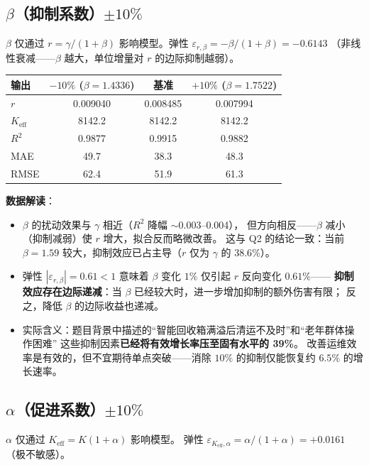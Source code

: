 \documentclass[12pt,a4paper]{article}
\begin{document}
\subsection{$\beta$（抑制系数）$\pm 10\%$}

$\beta$ 仅通过 $r = \gamma/(1+\beta)$ 影响模型。弹性 $\varepsilon_{r,\beta} = -\beta/(1+\beta) = -0.6143$
（非线性衰减——$\beta$ 越大，单位增量对 $r$ 的边际抑制越弱）。

\begin{center}
\begin{tabular}{lccc}
\toprule
输出 & $-10\%$ ($\beta = 1.4336$) & 基准 & $+10\%$ ($\beta = 1.7522$) \\
\midrule
$r$      & 0.009040 & 0.008485 & 0.007994 \\
$K_{\text{eff}}$ & 8142.2 & 8142.2 & 8142.2 \\
$R^2$    & 0.9877 & 0.9915 & 0.9882 \\
MAE      & 49.7 & 38.3 & 48.3 \\
RMSE     & 62.4 & 51.9 & 61.3 \\
\bottomrule
\end{tabular}
\end{center}

\textbf{数据解读}：
\begin{itemize}
  \item $\beta$ 的扰动效果与 $\gamma$ 相近（$R^2$ 降幅 $\sim$0.003--0.004），
        但方向相反——$\beta$ 减小（抑制减弱）使 $r$ 增大，拟合反而略微改善。
        这与 Q2 的结论一致：当前 $\beta = 1.59$ 较大，抑制效应已占主导（$r$ 仅为 $\gamma$ 的 $38.6\%$）。
  \item 弹性 $|\varepsilon_{r,\beta}| = 0.61 < 1$ 意味着 $\beta$ 变化 $1\%$ 仅引起 $r$ 反向变化 $0.61\%$——
        \textbf{抑制效应存在边际递减}：当 $\beta$ 已经较大时，进一步增加抑制的额外伤害有限；
        反之，降低 $\beta$ 的边际收益也递减。
  \item 实际含义：题目背景中描述的``智能回收箱满溢后清运不及时''和``老年群体操作困难''
        这些抑制因素\textbf{已经将有效增长率压至固有水平的 39\%}。
        改善运维效率是有效的，但不宜期待单点突破——消除 $10\%$ 的抑制仅能恢复约 $6.5\%$ 的增长速率。
\end{itemize}

\subsection{$\alpha$（促进系数）$\pm 10\%$}

$\alpha$ 仅通过 $K_{\text{eff}} = K(1+\alpha)$ 影响模型。
弹性 $\varepsilon_{K_{\text{eff}},\alpha} = \alpha/(1+\alpha) = +0.0161$（极不敏感）。
\end{document}
